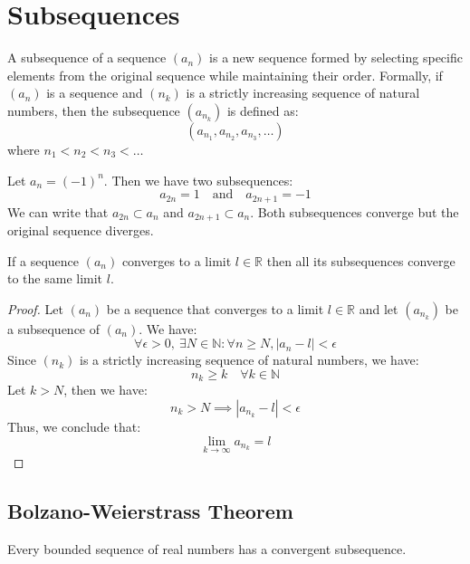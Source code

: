 \section{Subsequences}
\begin{definition}[Subsequence]
    A subsequence of a sequence \( (a_n) \) is a new sequence formed by selecting specific elements from the original sequence while maintaining their order. Formally, if \( (a_n) \) is a sequence and \( (n_k) \) is a strictly increasing sequence of natural numbers, then the subsequence \( (a_{n_k}) \) is defined as:
    \[
        (a_{n_1}, a_{n_2}, a_{n_3}, \ldots)
    \]
    where \( n_1 < n_2 < n_3 < \ldots \)
\end{definition}
\begin{eg}
    Let $a_n = (-1)^n$. Then we have two subsequences:
    \[ a_{2n} = 1 \quad \text{and} \quad a_{2n + 1} = -1 \]
    We can write that $a_{2n} \subset a_n$ and $a_{2n + 1} \subset a_n$. Both subsequences converge but the original sequence diverges.
\end{eg}

\begin{theorem}
    If a sequence $(a_n)$ converges to a limit $l \in \mathbb{R}$ then all its subsequences converge to the same limit $l$.
\end{theorem}
\begin{proof}
    Let $(a_n)$ be a sequence that converges to a limit $l \in \mathbb{R}$ and let $(a_{n_k})$ be a subsequence of $(a_n)$. We have:
    \[ \forall \epsilon > 0, \ \exists N \in \mathbb{N} : \forall n \geq N, |a_n - l| < \epsilon \]
    Since $(n_k)$ is a strictly increasing sequence of natural numbers, we have:
    \[ n_k \geq k \quad \forall k \in \mathbb{N} \]
    Let $k > N$, then we have:
    \[ n_k > N \implies |a_{n_k} - l| < \epsilon \]
    Thus, we conclude that:
    \[ \lim_{k \to \infty} a_{n_k} = l \]
\end{proof}

\subsection{Bolzano-Weierstrass Theorem}
\begin{theorem}
    Every bounded sequence of real numbers has a convergent subsequence.
\end{theorem}

